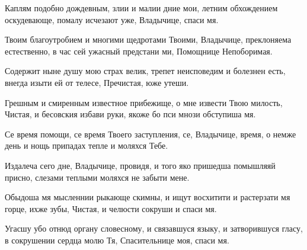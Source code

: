 \begin{mymulticols}





Каплям подобно дождевным, злии и малии дние мои, летним обхождением оскудевающе, помалу исчезают уже, Владычице, спаси мя. 


Твоим благоутробием и многими щедротами Твоими, Владычице, преклоняема естественно, в час сей ужасный предстани ми, Помощнице Непоборимая. 


Содержит ныне душу мою страх велик, трепет неисповедим и болезнен есть, внегда изыти ей от телесе, Пречистая, юже утеши. 

\slavan

Грешным и смиренным известное прибежище, о мне извести Твою милость, Чистая, и бесовския избави руки, якоже бо пси мнози обступиша мя. 

\inynen

Се время помощи, се время Твоего заступления, се, Владычице, время, о немже день и нощь припадах тепле и моляхся Тебе.




Издалеча сего дне, Владычице, провидя, и того яко пришедша помышляяй присно, слезами теплыми моляхся не забыти мене. 


Обыдоша мя мысленнии рыкающе скимны, и ищут восхитити и растерзати мя горце, ихже зубы, Чистая, и челюсти сокруши и спаси мя. 


Угасшу убо отнюд органу словесному, и связавшуся языку, и затворившуся гласу, в сокрушении сердца молю Тя, Спасительнице моя, спаси мя. 


\end{mymulticols}
